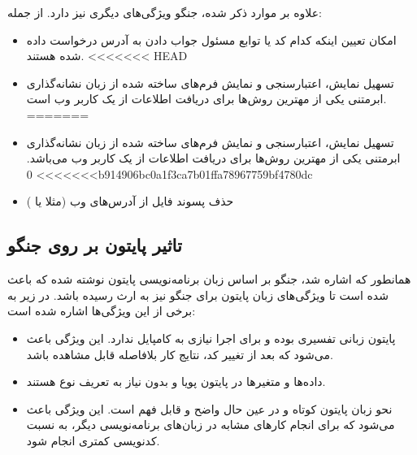 {{علاوه بر موارد ذکر شده، جنگو ویژگی‌های دیگری نیز دارد. از جمله:
\begin{itemize}
	\item امکان تعیین اینکه کدام کد یا توابع مسئول جواب دادن به آدرس درخواست داده شده هستند.
<<<<<<< HEAD
	\item تسهیل نمایش، اعتبارسنجی و نمایش فرم‌های ساخته شده از زبان نشانه‌گذاری ابرمتنی یکی از مهترین روش‌ها برای دریافت اطلاعات از یک کاربر وب است.
=======
	\item تسهیل نمایش، اعتبارسنجی و نمایش فرم‌های ساخته شده از زبان نشانه‌گذاری ابرمتنی یکی از مهترین روش‌ها برای دریافت اطلاعات از یک کاربر وب می‌باشد.
>>>>>>> 0b914906bc0a1f3ca7b01ffa78967759bf4780dc
	\item حذف پسوند فایل از آدرس‌‌های وب (مثلا  یا )
\end{itemize}
 
\subsection{تاثیر پایتون بر روی جنگو}
همانطور که اشاره شد، جنگو بر اساس زبان برنامه‌نویسی پایتون نوشته شده که باعث شده است تا ویژگی‌های زبان پایتون برای جنگو نیز به ارث رسیده باشد. در زیر به برخی از این ویژگی‌ها اشاره شده است:
\begin{itemize}
	\item پایتون زبانی تفسیری بوده و برای اجرا نیازی به کامپایل ندارد. این ویژگی باعث می‌شود که بعد از تغییر کد، نتایج کار بلافاصله قابل مشاهده باشد.
	\item داده‌ها و متغیر‌ها در پایتون پویا و بدون نیاز به تعریف نوع هستند.
	\item نحو زبان پایتون کوتاه و در عین حال واضح و قابل فهم است. این ویژگی باعث می‌شود که برای انجام کارهای مشابه در زبان‌های برنامه‌نویسی دیگر، به نسبت کدنویسی کمتری انجام شود.
\end{itemize}

 
}}

